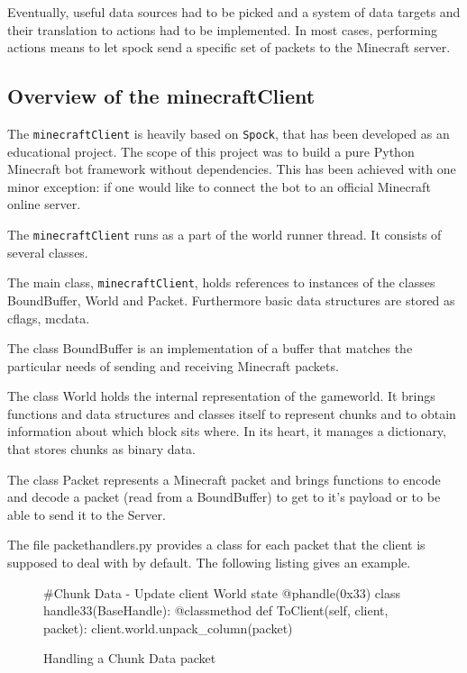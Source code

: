 Eventually, useful data sources had to be picked and a system of data targets and their translation to actions had to be implemented. In most cases, performing actions means to let spock send a specific set of packets to the Minecraft server.

        \subsection{Overview of the minecraftClient}
The \texttt{minecraftClient} is heavily based on \texttt{Spock}, that has been developed as an educational project. The scope of this project was to build a pure Python Minecraft bot framework without dependencies. This has been achieved with one minor exception: if one would like to connect the bot to an official Minecraft online server.  

The \texttt{minecraftClient} runs as a part of the world runner thread. It consists of several classes. 

The main class, \texttt{minecraftClient}, holds references to instances of the classes BoundBuffer,  World and Packet. Furthermore basic data structures are stored as cflags, mcdata.

The class BoundBuffer is an implementation of a buffer that matches the particular needs of sending and receiving Minecraft packets.

The class World holds the internal representation of the gameworld. It brings functions and data structures and classes itself to represent chunks and to obtain information about which block sits where. In its heart, it manages a dictionary, that stores chunks as binary data.

The class Packet represents a Minecraft packet and brings functions to encode and decode a packet (read from a BoundBuffer) to get to it's payload or to be able to send it to the Server.

The file packethandlers.py provides a class for each packet that the client is supposed to deal with by default. The following listing gives an example. %


		\begin{figure}[ht]
			\centering
			\begin{minipage}{11cm}
				\begin{pseudocode}
#Chunk Data - Update client World state
@phandle(0x33)
class handle33(BaseHandle):
	@classmethod
	def ToClient(self, client, packet):
		client.world.unpack_column(packet)
					\end{pseudocode}
				\caption{Handling a Chunk Data packet}
				\label{packet_handling}
			\end{minipage}
		\end{figure}

